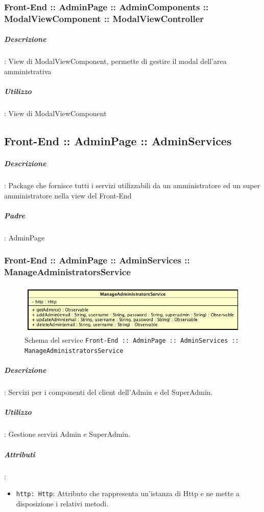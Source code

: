 \documentclass[../ManualeSviluppatore_v2.0.0.tex]{subfiles}
\begin{document}
				\subsubsection{Front-End :: AdminPage :: AdminComponents :: ModalViewComponent :: ModalViewController}
					\subparagraph{Descrizione}: View di ModalViewComponent, permette di gestire il modal dell'area amministrativa
					\subparagraph{Utilizzo}: View di ModalViewComponent


	\newpage
	\subsection{Front-End :: AdminPage :: AdminServices}

			\subparagraph{Descrizione}: Package che fornisce tutti i servizi utilizzabili da un amministratore ed un super amministratore nella view del Front-End
			\subparagraph{Padre}: AdminPage

				\subsubsection{Front-End :: AdminPage :: AdminServices :: ManageAdministratorsService}
				\begin{figure}[!h]
					\centering
					\includegraphics[scale=0.6]{Architettura/Front-End/AdminPage/AdminServices/ManageAdministratorsService.png}
					\caption{Schema del service \texttt{Front-End :: AdminPage :: AdminServices :: ManageAdministratorsService}}
				\end{figure}

					\subparagraph{Descrizione}: Servizi per i componenti del client dell'Admin e del SuperAdmin.
					\subparagraph{Utilizzo}: Gestione servizi Admin e SuperAdmin.
					\subparagraph{Attributi}:
					\begin{itemize}
						\item \texttt{http: Http}: Attributo che rappresenta un'istanza di Http e ne mette a disposizione i relativi metodi.
					\end{itemize}
\newpage
\end{document}
